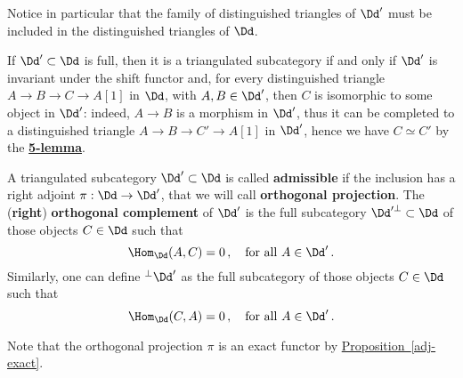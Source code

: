 \begin{rmk}
    \begin{rmnumerate}
        \item Notice in particular that the family of distinguished triangles
        of $\Dd'$ must be included in the distinguished triangles of $\Dd$.

        \item If $\Dd' \subset \Dd$ is full, then it is a triangulated subcategory
        if and only if $\Dd'$ is invariant under the shift functor and,
        for every distinguished triangle $A \to B \to C \to A{[1]}$ in $\Dd$,
        with $A,B \in \Dd'$, then $C$ is isomorphic to some object in $\Dd'$:
        indeed, $A \to B$ is a morphism in $\Dd'$, thus it can be completed
        to a distinguished triangle $A \to B \to C' \to A{[1]}$ in $\Dd'$,
        hence  we have $C \simeq C'$ by the \hyperref[5lemma]{\textbf{5-lemma}}.
    \end{rmnumerate}
\end{rmk}

\begin{df}
    A triangulated subcategory $\Dd' \subset \Dd$ is called \textbf{admissible}
    if the inclusion has a right adjoint $\pi: \Dd \to \Dd'$, that we will call
    \textbf{orthogonal projection}. 
    The (\textbf{right}) \textbf{orthogonal complement} of $\Dd'$
    is the full subcategory $\Dd'^{\perp} \subset \Dd$ of those objects $C \in \Dd$
    such that
    \begin{equation*}
        \Hom_{\Dd}(A,C) = 0\,, \quad \text{for all } A \in \Dd'\,.
    \end{equation*}
    Similarly, one can define ${}^{\perp}\Dd'$ as the full subcategory
    of those objects $C \in \Dd$ such that
    \begin{equation*}
        \Hom_{\Dd}(C,A) = 0\,, \quad \text{for all } A \in \Dd'\,.
    \end{equation*}
\end{df}

Note that the orthogonal projection $\pi$ is an exact functor 
by \hyperref[adj-exact]{Proposition~\ref*{adj-exact}}.


